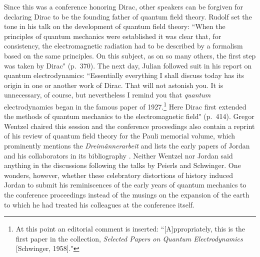 \documentclass[12pt]{elsart}
\begin{document}
Since this was a conference honoring Dirac, other speakers can be forgiven for declaring Dirac to be the founding father of quantum field theory. Rudolf \citet{Peierls 1973} set the tone in his talk on the development of quantum field theory: ``When the principles of quantum mechanics were established it was clear that, for consistency, the electromagnetic radiation had to be described by a formalism based on the same principles. On  this subject, as on so many others, the first step was taken by Dirac" (p.\ 370).
The next day, Julian \citet{Schwinger 1973} followed suit in his report on quantum electrodynamics: ``Essentially everything I shall discuss today has its origin in one or another work of Dirac. That will not astonish you. It is unnecessary, of course, but nevertheless I remind you that {\it quantum} electrodynamics began in the famous paper of 1927.\footnote{At this point an editorial comment is inserted: 
``[A]ppropriately, this is the first paper in the collection, {\it Selected Papers on Quantum Electrodynamics} [Schwinger, 1958]."} Here Dirac first extended the methods of quantum mechanics to the electromagnetic field" (p.\ 414). Gregor Wentzel chaired this session and the conference proceedings also contain a reprint of  his review of quantum field theory for the Pauli memorial volume, which prominently mentions the {\it Dreim\"annerarbeit} and lists the early papers of Jordan and his collaborators in its bibliography \citep[p.\ 49 and pp.\ 74--75]{Wentzel 1960}. Neither Wentzel nor Jordan said anything in the discussions following the talks by Peierls and Schwinger.
One wonders, however, whether these celebratory distortions of history induced Jordan to submit his reminiscences of the early years of quantum mechanics to the conference proceedings instead of the musings on the expansion of the earth to which he had treated his colleagues at the conference itself.
\end{document}
